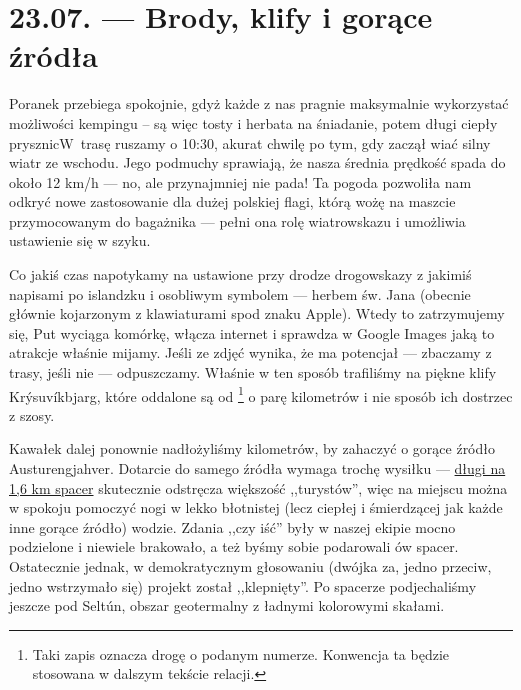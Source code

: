 \chapter*{23.07. --- Brody, klify i gorące źródła}

Poranek przebiega spokojnie, gdyż każde z nas pragnie maksymalnie wykorzystać możliwości kempingu -- są więc tosty i herbata na śniadanie, potem długi ciepły prysznic\textellipsis W~trasę ruszamy o 10:30, akurat chwilę po tym, gdy zaczął wiać silny wiatr ze wschodu. Jego podmuchy sprawiają, że nasza średnia prędkość spada do około 12 km/h --- no, ale przynajmniej nie pada! Ta pogoda pozwoliła nam odkryć nowe zastosowanie dla dużej polskiej flagi, którą wożę na maszcie przymocowanym do bagażnika --- pełni ona rolę wiatrowskazu i umożliwia ustawienie się w szyku.


Co jakiś czas napotykamy na ustawione przy drodze drogowskazy z jakimiś napisami po islandzku i osobliwym symbolem --- herbem św. Jana (obecnie głównie kojarzonym z klawiaturami spod znaku Apple). Wtedy to zatrzymujemy się, Put wyciąga komórkę, włącza internet i sprawdza w Google Images jaką to atrakcje właśnie mijamy. Jeśli ze zdjęć wynika, że ma potencjał --- zbaczamy z trasy, jeśli nie --- odpuszczamy. Właśnie w ten sposób trafiliśmy na piękne klify Krýsuvíkbjarg, które oddalone są od \footnote{Taki zapis oznacza drogę o podanym numerze. Konwencja ta będzie stosowana w dalszym tekście relacji.} o parę kilometrów i nie sposób ich dostrzec z szosy.

Kawałek dalej ponownie nadłożyliśmy kilometrów, by zahaczyć o gorące źródło Austurengjahver. Dotarcie do samego źródła wymaga trochę wysiłku --- \href{http://www.openstreetmap.org/way/33182596}{długi na 1,6 km spacer} skutecznie odstręcza większość ,,turystów'', więc na miejscu można w spokoju pomoczyć nogi w lekko błotnistej (lecz ciepłej i śmierdzącej jak każde inne gorące źródło) wodzie. Zdania ,,czy iść'' były w naszej ekipie mocno podzielone i niewiele brakowało, a też byśmy sobie podarowali ów spacer. Ostatecznie jednak, w demokratycznym głosowaniu (dwójka za, jedno przeciw, jedno wstrzymało się) projekt został ,,klepnięty''. Po spacerze podjechaliśmy jeszcze pod Seltún, obszar geotermalny z ładnymi kolorowymi skałami.

